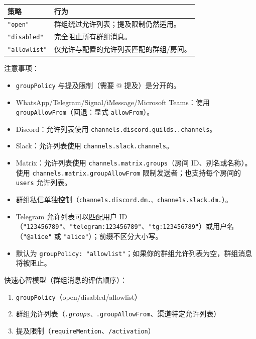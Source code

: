 \begin{table}[h]
\centering
\small
\begin{tabular}{|l|l|}
\hline
策略 & 行为 \\
\hline
\texttt{"open"} & 群组绕过允许列表；提及限制仍然适用。 \\
\hline
\texttt{"disabled"} & 完全阻止所有群组消息。 \\
\hline
\texttt{"allowlist"} & 仅允许与配置的允许列表匹配的群组/房间。 \\
\hline
\end{tabular}
\end{table}



注意事项：

\begin{itemize}
  \item \texttt{groupPolicy} 与提及限制（需要 @ 提及）是分开的。
  \item WhatsApp/Telegram/Signal/iMessage/Microsoft Teams：使用 \texttt{groupAllowFrom}（回退：显式 \texttt{allowFrom}）。
  \item Discord：允许列表使用 \texttt{channels.discord.guilds..channels}。
  \item Slack：允许列表使用 \texttt{channels.slack.channels}。
  \item Matrix：允许列表使用 \texttt{channels.matrix.groups}（房间 ID、别名或名称）。使用 \texttt{channels.matrix.groupAllowFrom} 限制发送者；也支持每个房间的 \texttt{users} 允许列表。
  \item 群组私信单独控制（\texttt{channels.discord.dm.\textit{}、\texttt{channels.slack.dm.}}）。
  \item Telegram 允许列表可以匹配用户 ID（\texttt{"123456789"}、\texttt{"telegram:123456789"}、\texttt{"tg:123456789"}）或用户名（\texttt{"@alice"} 或 \texttt{"alice"}）；前缀不区分大小写。
  \item 默认为 \texttt{groupPolicy: "allowlist"}；如果你的群组允许列表为空，群组消息将被阻止。
\end{itemize}


快速心智模型（群组消息的评估顺序）：

\begin{enumerate}
  \item \texttt{groupPolicy}（open/disabled/allowlist）
  \item 群组允许列表（\texttt{\textit{.groups}、\texttt{}.groupAllowFrom}、渠道特定允许列表）
  \item 提及限制（\texttt{requireMention}、\texttt{/activation}）
\end{enumerate}


